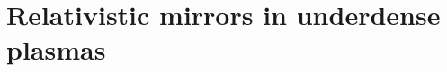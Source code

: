 \documentclass[10pt, a4paper, twoside, openright]{report}
\begin{document}
%

%

%

%



%


\section{Relativistic mirrors in underdense plasmas\label{sec:rfm}}
%

%

%
\end{document}
